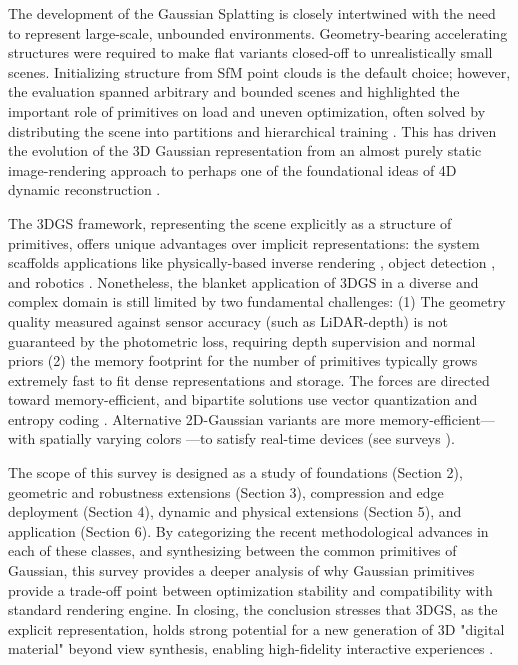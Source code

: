 \documentclass[11pt,a4paper]{article}
\begin{document}
The development of the Gaussian Splatting is closely intertwined with the need to represent large-scale, unbounded environments. Geometry-bearing accelerating structures were required to make flat variants closed-off to unrealistically small scenes. Initializing structure from SfM point clouds is the default choice; however, the evaluation spanned arbitrary and bounded scenes and highlighted the important role of primitives on load and uneven optimization, often solved by distributing the scene into partitions and hierarchical training \cite{arxiv:2406.12080v1}. This has driven the evolution of the 3D Gaussian representation from an almost purely static image-rendering approach to perhaps one of the foundational ideas of 4D dynamic reconstruction \cite{arxiv:2412.20720v2,arxiv:2310.08528v2}.

The 3DGS framework, representing the scene explicitly as a structure of primitives, offers unique advantages over implicit representations: the system scaffolds applications like physically-based inverse rendering \cite{arxiv:2602.17117v1}, object detection \cite{arxiv:2504.13204v2}, and robotics \cite{arxiv:2410.12262v2}. Nonetheless, the blanket application of 3DGS in a diverse and complex domain is still limited by two fundamental challenges: (1) The geometry quality measured against sensor accuracy (such as LiDAR-depth) is not guaranteed by the photometric loss, requiring depth supervision \cite{arxiv:2403.17822v1} and normal priors \cite{arxiv:2311.17910v1} (2) the memory footprint for the number of primitives typically grows extremely fast to fit dense representations and storage. The forces are directed toward memory-efficient, and bipartite solutions use vector quantization and entropy coding \cite{arxiv:2311.18159v3,arxiv:2509.07021v3}. Alternative 2D-Gaussian variants are more memory-efficient---with spatially varying colors \cite{arxiv:2411.18966v2}---to satisfy real-time devices (see surveys \cite{arxiv:2502.19457v1}). 

The scope of this survey is designed as a study of foundations (Section 2), geometric and robustness extensions (Section 3), compression and edge deployment (Section 4), dynamic and physical extensions (Section 5), and application (Section 6). By categorizing the recent methodological advances in each of these classes, and synthesizing between the common primitives of Gaussian, this survey provides a deeper analysis of why Gaussian primitives provide a trade-off point between optimization stability and compatibility with standard rendering engine. In closing, the conclusion stresses that 3DGS, as the explicit representation, holds strong potential for a new generation of 3D "digital material" beyond view synthesis, enabling high-fidelity interactive experiences \cite{arxiv:2412.06257v2}.
\end{document}

